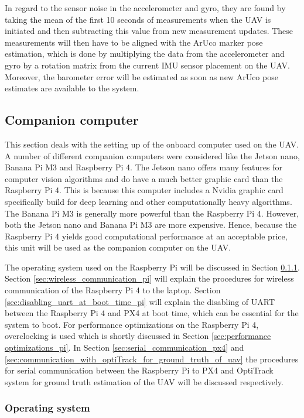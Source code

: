 \documentclass[../Head/report.tex]{subfiles}
\begin{document}
In regard to the sensor noise in the accelerometer and gyro, they are found by taking the mean of the first 10 seconds of measurements when the UAV is initiated and then subtracting this value from new measurement updates. These measurements will then have to be aligned with the ArUco marker pose estimation, which is done by multiplying the data from the accelerometer and gyro by a rotation matrix from the current IMU sensor placement on the UAV. Moreover, the barometer error will be estimated as soon as new ArUco pose estimates are available to the system.  

\subsection{Companion computer}
\label{sec:companion_computer}

This section deals with the setting up of the onboard computer used on the UAV. A number of different companion computers were considered like the Jetson nano, Banana Pi M3 and Raspberry Pi 4. The Jetson nano offers many features for computer vision algorithms and do have a much better graphic card than the Raspberry Pi 4. This is because this computer includes a Nvidia graphic card specifically build for deep learning and other computationally heavy algorithms. The Banana Pi M3 is generally more powerful than the Raspberry Pi 4. However, both the Jetson nano and Banana Pi M3 are more expensive. Hence, because the Raspberry Pi 4 yields good computational performance at an acceptable price, this unit will be used as the companion computer on the UAV. 

The operating system used on the Raspberry Pi will be discussed in Section \ref{sec:operating_system_pi}. Section \ref{sec:wireless_communication_pi} will explain the procedures for wireless communication of the Raspberry Pi 4 to the laptop. Section \ref{sec:disabling_uart_at_boot_time_pi} will explain the disabling of UART between the Raspberry Pi 4 and PX4 at boot time, which can be essential for the system to boot. For performance optimizations on the Raspberry Pi 4, overclocking is used which is shortly discussed in Section \ref{sec:performance optimizations_pi}. In Section \ref{sec:serial_communication_px4} and \ref{sec:communication_with_optiTrack_for_ground_truth_of_uav} the procedures for serial communication between the Raspberry Pi to PX4 and OptiTrack system for ground truth estimation of the UAV will be discussed respectively. 

\subsubsection{Operating system}
\label{sec:operating_system_pi}
\end{document}
